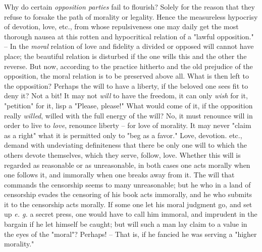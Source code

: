 Why do certain \textit{opposition parties} fail to flourish? Solely for the 
reason that they refuse to forsake the path of morality or legality. Hence the 
measureless hypocrisy of devotion, love, etc., from whose repulsiveness one 
may daily get the most thorough nausea at this rotten and hypocritical 
relation of a "{}lawful opposition."{} -- In the \textit{moral} relation of 
love and fidelity a divided or opposed will cannot have place; the beautiful 
relation is disturbed if the one wills this and the other the reverse. But 
now, according to the practice hitherto and the old prejudice of the 
opposition, the moral relation is to be preserved above all. What is then left 
to the opposition? Perhaps the will to have a liberty, if the beloved one sees 
fit to deny it? Not a bit! It may not \textit{will} to have the freedom, it 
can only \textit{wish} for it, "{}petition"{} for it, lisp a "{}Please, 
please!"{} What would come of it, if the opposition really \textit{willed}, 
willed with the full energy of the will? No, it must renounce will in order to 
live to \textit{love}, renounce liberty -- for love of morality. It may never 
"{}claim as a right"{} what it is permitted only to "{}beg as a favor."{} 
Love, devotion. etc., demand with undeviating definiteness that there be only 
one will to which the others devote themselves, which they serve, follow, 
love. Whether this will is regarded as reasonable or as unreasonable, in both 
cases one acts morally when one follows it, and immorally when one breaks away 
from it. The will that commands the censorship seems to many unreasonable; but 
he who in a land of censorship evades the censoring of his book acts 
immorally, and he who submits it to the censorship acts morally. If some one 
let his moral judgment go, and set up \textit{e. g.} a secret press, one would 
have to call him immoral, and imprudent in the bargain if he let himself be 
caught; but will such a man lay claim to a value in the eyes of the 
"{}moral"{}? Perhaps! -- That is, if he fancied he was serving a "{}higher 
morality."{}

